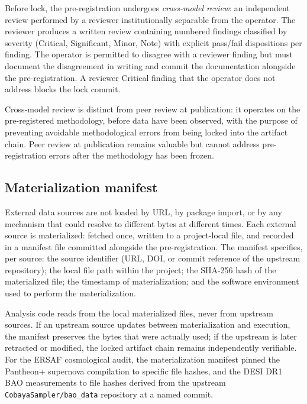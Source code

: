 \documentclass[11pt]{article}
\begin{document}
Before lock, the pre-registration undergoes \emph{cross-model review}:
an independent review performed by a reviewer institutionally
separable from the operator. The reviewer produces a written review
containing numbered findings classified by severity (Critical,
Significant, Minor, Note) with explicit pass/fail dispositions per
finding. The operator is permitted to disagree with a reviewer finding
but must document the disagreement in writing and commit the
documentation alongside the pre-registration. A reviewer Critical
finding that the operator does not address blocks the lock commit.

Cross-model review is distinct from peer review at publication: it
operates on the pre-registered methodology, before data have been
observed, with the purpose of preventing avoidable methodological
errors from being locked into the artifact chain. Peer review at
publication remains valuable but cannot address pre-registration
errors after the methodology has been frozen.

\subsection{Materialization manifest}
\label{subsec:materialization}

External data sources are not loaded by URL, by package import, or by
any mechanism that could resolve to different bytes at different
times. Each external source is materialized: fetched once, written to
a project-local file, and recorded in a manifest file committed
alongside the pre-registration. The manifest specifies, per source:
the source identifier (URL, DOI, or commit reference of the upstream
repository); the local file path within the project; the SHA-256 hash
of the materialized file; the timestamp of materialization; and the
software environment used to perform the materialization.

Analysis code reads from the local materialized files, never from
upstream sources. If an upstream source updates between materialization
and execution, the manifest preserves the bytes that were actually
used; if the upstream is later retracted or modified, the locked
artifact chain remains independently verifiable. For the ERSAF
cosmological audit, the materialization manifest pinned the
Pantheon+ supernova compilation \cite{brout2022pantheon} to specific
file hashes, and the DESI DR1 BAO measurements
\cite{adame2024desi3, adame2024desi4} to file hashes derived from the
upstream \texttt{CobayaSampler/bao\_data} repository at a named
commit.
\end{document}
